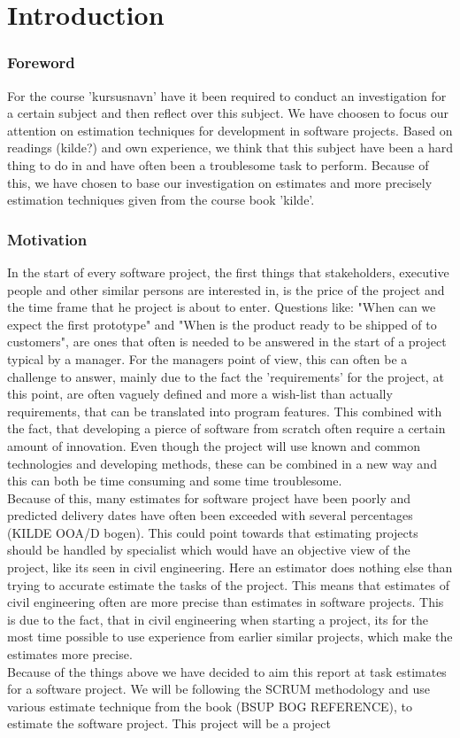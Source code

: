 \part{Introduction}
\section{Foreword}
For the course 'kursusnavn' have it been required to conduct an investigation for a certain subject and then reflect over this subject. We have choosen to focus our attention on estimation techniques for development in software projects. Based on readings (kilde?) and own experience, we think that this subject have been a hard thing to do in and have often been a  troublesome task to perform. Because of this, we have chosen to base our investigation on estimates and more precisely estimation techniques given from the course book 'kilde'. 

\section{Motivation}
In the start of every software project, the first things that stakeholders, executive people and other similar persons are interested in, is the price of the project and the time frame that he project is about to enter. Questions like: "When can we expect the first prototype" and "When is the product ready to be shipped of to customers", are ones that often is needed to be answered in the start of a project typical by a manager. For the managers point of view, this can often be a challenge to answer, mainly due to the fact the 'requirements' for the project, at this point, are often vaguely defined and more a wish-list than actually requirements, that can be translated into program features. This combined with the fact, that developing a pierce of software from scratch often require a certain amount of innovation. Even though the project  will use known and common technologies and developing methods, these can be combined in a new way and this can both be time consuming and some time troublesome. \\
Because of this, many estimates for software project have been poorly and predicted delivery dates have often been exceeded with several percentages (KILDE OOA/D bogen). This could point towards that estimating projects should be handled by specialist which would have an objective view of the project, like its seen in civil engineering. Here an estimator does nothing else than trying to accurate estimate the tasks of the project. This means that estimates of civil engineering often are more precise than estimates in software projects. This is due to the fact, that in civil engineering when starting a project, its for the most time possible to use experience from earlier similar projects, which make the estimates more precise. \\
Because of the things above we have decided to aim this report at task estimates for a software project. We will be following the SCRUM methodology and use various estimate technique from the book (BSUP BOG REFERENCE), to estimate the software project. This project will be a project 